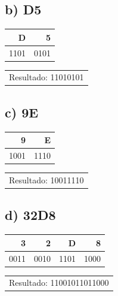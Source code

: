 \documentclass[12pt]{article}
\begin{document}
\subsection*{b) D5}
\label{sec:orgdb43444}
\begin{mdframed}
\begin{center}
\begin{tabular}{rr}
D & 5\\
\hline
1101 & 0101\\
\end{tabular}
\end{center}

\begin{center}
\begin{tabular}{l}
Resultado: 11010101\\
\end{tabular}
\end{center}
\end{mdframed}

\subsection*{c) 9E}
\label{sec:org1c394ff}
\begin{mdframed}
\begin{center}
\begin{tabular}{rr}
9 & E\\
\hline
1001 & 1110\\
\end{tabular}
\end{center}

\begin{center}
\begin{tabular}{l}
Resultado: 10011110\\
\end{tabular}
\end{center}
\end{mdframed}

\subsection*{d) 32D8}
\label{sec:orge316702}
\begin{mdframed}
\begin{center}
\begin{tabular}{rrrr}
3 & 2 & D & 8\\
\hline
0011 & 0010 & 1101 & 1000\\
\end{tabular}
\end{center}

\begin{center}
\begin{tabular}{l}
Resultado: 11001011011000\\
\end{tabular}
\end{center}
\end{mdframed}
\end{document}
